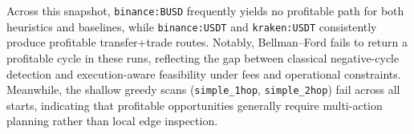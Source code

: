 Across this snapshot, \texttt{binance:BUSD} frequently yields no profitable path for both heuristics and baselines, while \texttt{binance:USDT} and \texttt{kraken:USDT} consistently produce profitable transfer+trade routes. Notably, Bellman--Ford fails to return a profitable cycle in these runs, reflecting the gap between classical negative-cycle detection and execution-aware feasibility under fees and operational constraints. Meanwhile, the shallow greedy scans (\texttt{simple\_1hop}, \texttt{simple\_2hop}) fail across all starts, indicating that profitable opportunities generally require multi-action planning rather than local edge inspection.
